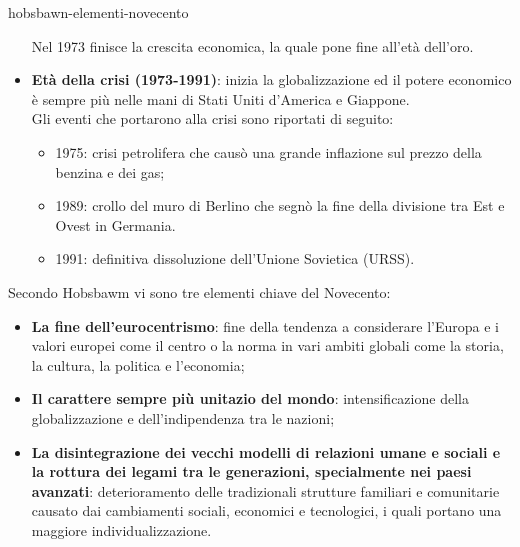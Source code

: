 \documentclass[preview]{standalone}
\begin{document}
\begin{snippet}{hobsbawn-elementi-novecento}
\begin{itemize}
            Nel 1973 finisce la crescita economica, la quale pone fine all'età dell'oro.
        \item \textbf{Età della crisi (1973-1991)}: inizia la globalizzazione ed il potere economico
            è sempre più nelle mani di Stati Uniti d'America e Giappone.\\
            Gli eventi che portarono alla crisi sono riportati di seguito:
            \begin{itemize}
                \item 1975: crisi petrolifera che causò una grande inflazione sul prezzo della benzina e dei gas;
                \item 1989: crollo del muro di Berlino che segnò la fine della divisione tra
                    Est e Ovest in Germania.
                \item 1991: definitiva dissoluzione dell'Unione Sovietica (URSS).
            \end{itemize}
    \end{itemize}
    Secondo Hobsbawm vi sono tre elementi chiave del Novecento:
    \begin{itemize}
        \item \textbf{La fine dell'eurocentrismo}:
            fine della tendenza a considerare l'Europa e i valori europei come il centro o la norma
            in vari ambiti globali come la storia, la cultura, la politica e l'economia;
        \item \textbf{Il carattere sempre più unitazio del mondo}:
            intensificazione della globalizzazione e dell'indipendenza tra le nazioni;
        \item \textbf{La disintegrazione dei vecchi modelli di relazioni umane e sociali e la rottura
            dei legami tra le generazioni, specialmente nei paesi avanzati}:
            deterioramento delle tradizionali strutture familiari e comunitarie causato dai 
            cambiamenti sociali, economici e tecnologici, i quali portano una maggiore individualizzazione.
    \end{itemize}
\end{snippet}
\end{document}
